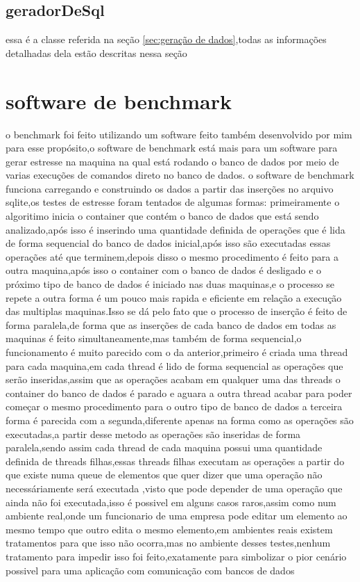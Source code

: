 \documentclass[
	12pt,				%
	openright,			%
	oneside,			%
	a4paper,			%
	english,			%
	french,				%
	spanish,			%
	brazil,				%
	]{abntex2}
\begin{document}
\subsection{geradorDeSql}
\label{subsec:geradorDeSql}
essa é a classe referida na seção \autoref{sec:geração de dados},todas as informações detalhadas dela estão descritas nessa seção

\section{software de benchmark}
\label{sec:software de benchmark}
o benchmark foi feito utilizando um software feito também desenvolvido por mim para esse propósito,o software de benchmark está mais para um software para gerar estresse na maquina na qual está rodando o banco de dados por meio de varias execuções de comandos direto no banco de dados.
o software de benchmark funciona carregando e construindo os dados a partir das inserções no arquivo sqlite,os testes de estresse foram tentados de algumas formas:\newline
primeiramente o algoritimo inicia o container que contém o banco de dados que está sendo analizado,após isso é inserindo uma quantidade definida de operações que é lida de forma sequencial do banco de dados inicial,após isso são executadas essas operações até que terminem,depois disso o mesmo procedimento é feito para a outra maquina,após isso o container com o banco de dados é desligado e o próximo tipo de banco de dados é iniciado nas duas maquinas,e o processo se repete\newline
a outra forma é um pouco mais rapida e eficiente em relação a execução das multiplas maquinas.Isso se dá pelo fato que o processo de inserção é feito de forma paralela,de forma que as inserções de cada banco de dados em todas as maquinas é feito simultaneamente,mas também de forma sequencial,o funcionamento é muito parecido com o da anterior,primeiro é criada uma thread para cada maquina,em cada thread é lido de forma sequencial as operações que serão inseridas,assim que as operações acabam em qualquer uma das threads o container do banco de dados é parado e aguara a outra thread acabar para poder começar o mesmo procedimento para o outro tipo de banco de dados\newline
a terceira forma é parecida com a segunda,diferente apenas na forma como as operações são executadas,a partir desse metodo as operações são inseridas de forma paralela,sendo assim cada thread de cada maquina possui uma quantidade definida de threads filhas,essas threads filhas executam as operações a partir do que existe numa queue de elementos que quer dizer que uma operação não necessáriamente será executada ,visto que pode depender de uma operação que ainda não foi executada,isso é possivel em alguns casos raros,assim como num ambiente real,onde um funcionario de uma empresa pode editar um elemento ao mesmo tempo que outro edita o mesmo elemento,em ambientes reais existem tratamentos para que isso não ocorra,mas no ambiente desses testes,nenhum tratamento para impedir isso foi feito,exatamente para simbolizar o pior cenário possivel para uma aplicação com comunicação com bancos de dados\newline
\end{document}
